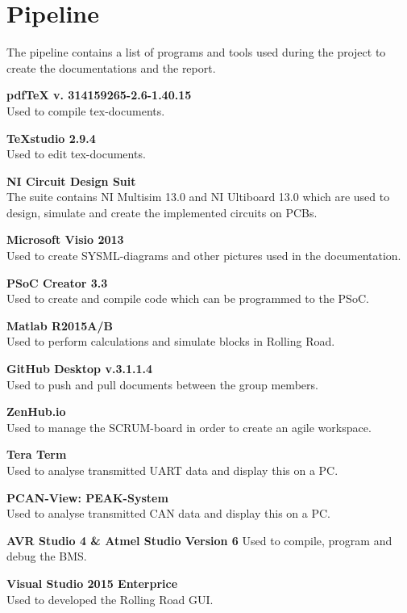 \chapter{Pipeline}
The pipeline contains a list of programs and tools used during the project to create the documentations and the report.

\textbf{pdfTeX v. 314159265-2.6-1.40.15}\\
Used to compile tex-documents.

\textbf{TeXstudio 2.9.4}\\
Used to edit tex-documents.

\textbf{NI Circuit Design Suit}\\
The suite contains NI Multisim 13.0 and NI Ultiboard 13.0 which are used to design, simulate and create the implemented circuits on PCBs.

\textbf{Microsoft Visio 2013}\\
Used to create SYSML-diagrams and other pictures used in the documentation.

\textbf{PSoC Creator 3.3}\\
Used to create and compile code which can be programmed to the PSoC.

\textbf{Matlab R2015A/B}\\
Used to perform calculations and simulate blocks in Rolling Road.

\textbf{GitHub Desktop v.3.1.1.4}\\
Used to push and pull documents between the group members.

\textbf{ZenHub.io}\\
Used to manage the SCRUM-board in order to create an agile workspace.

\textbf{Tera Term}\\
Used to analyse transmitted UART data and display this on a PC.

\textbf{PCAN-View: PEAK-System}\\
Used to analyse transmitted CAN data and display this on a PC.

\textbf{AVR Studio 4 \& Atmel Studio Version 6}
Used to compile, program and debug the BMS.

\textbf{Visual Studio 2015 Enterprice}\\
Used to developed the Rolling Road GUI.

